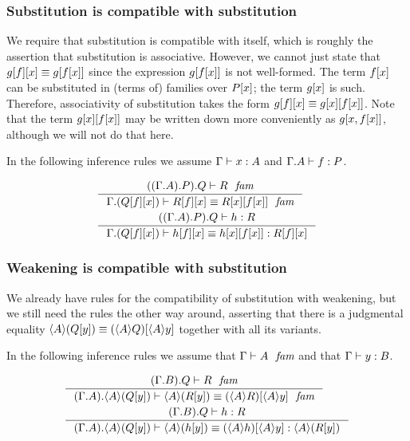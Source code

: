 \subsubsection{Substitution is compatible with substitution}\label{comp-ss}

We require that substitution is compatible with itself, which is roughly the
assertion that substitution is associative. However, we cannot just state that
$\subst{x}{{f}{g}}\jdeq\subst{{x}{f}}{g}$ since the expression $\subst{{x}{f}}{g}$
is not well-formed. The term $\subst{x}{f}$ can be substituted in (terms of) families over
$\subst{x}{P}$; the term $\subst{x}{g}$ is such. Therefore, associativity of
substitution takes the form $\subst{x}{{f}{g}}\jdeq\subst{{x}{f}}{{x}{g}}$.
Note that the term $\subst{{x}{f}}{{x}{g}}$ may be written down more conveniently
as $\subst{x,\subst{x}{f}}{g}$, although we will not do that here.

In the following inference rules we assume
$\jterm{\Gamma}{A}{x}$ and $\jterm{\ctxext{\Gamma}{A}}{P}{f}$.

\begin{align}
&\inference{\jfam{\ctxext{{{\Gamma}{A}}{P}}{Q}}{R}}
{\jfameq{\ctxext{\Gamma}{\subst{x}{{f}{Q}}}}{\subst{x}{{f}{R}}}{\subst{{x}{f}}{{x}{R}}}}\label{comp-ss-f}\\
&\inference{\jterm{\ctxext{{{\Gamma}{A}}{P}}{Q}}{R}{h}}
{\jtermeq{\ctxext{\Gamma}{\subst{x}{{f}{Q}}}}{\subst{x}{{f}{R}}}{\subst{x}{{f}{h}}}{\subst{{x}{f}}{{x}{h}}}}\label{comp-ss-t}
\end{align}

\subsubsection{Weakening is compatible with substitution}\label{comp-ws}
We already have rules for the compatibility of substitution with weakening, but
we still need the rules the other way around, asserting that there is a 
judgmental equality $\ctxwk{A}{\subst{y}{Q}}\jdeq\subst{\ctxwk{A}{y}}{\ctxwk{A}{Q}}$
together with all its variants.

In the following inference rules we assume that $\jfam{\Gamma}{A}$ and that
$\jterm{\Gamma}{B}{y}$.

\begin{align}
& \inference{\jfam{\ctxext{{\Gamma}{B}}{Q}}{R}}{\jfameq{\ctxext{{\Gamma}{A}}{\ctxwk{A}{\subst{y}{Q}}}}{\ctxwk{A}{\subst{y}{R}}}{\subst{\ctxwk{A}{y}}{\ctxwk{A}{R}}}}\label{comp-ws-f}\\
& \inference{\jterm{\ctxext{{\Gamma}{B}}{Q}}{R}{h}}{\jtermeq{\ctxext{{\Gamma}{A}}{\ctxwk{A}{\subst{y}{Q}}}}{\ctxwk{A}{\subst{y}{R}}}{\ctxwk{A}{\subst{y}{h}}}{\subst{\ctxwk{A}{y}}{\ctxwk{A}{h}}}}\label{comp-ws-t}
\end{align}

